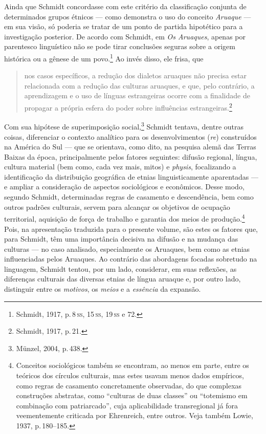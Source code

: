 Ainda que Schmidt concordasse com este critério da classificação
conjunta de determinados grupos étnicos --- como demonstra o uso do
conceito \textit{Aruaque} --- em sua visão, só poderia se tratar de um ponto
de partida hipotético para a investigação posterior. De acordo com
Schmidt, em \textit{Os Aruaques}, apenas por parentesco linguístico não se
pode tirar conclusões seguras sobre a origem histórica ou a gênese de um
povo.\footnote{Schmidt, 1917, p.\,8\,\textsc{ss}, 15\,\textsc{ss}, 19\,\textsc{ss} e 72.} Ao invés disso, ele frisa, que


\begin{quote}
nos casos específicos, a redução dos dialetos aruaques não precisa estar
relacionada com a redução das culturas aruaques, e que, pelo contrário, a
aprendizagem e o uso de línguas estrangeiras ocorre com a finalidade de
propagar a própria esfera do poder sobre influências
estrangeiras.\footnote{Schmidt, 1917, p.\,21.} %
\end{quote}

Com sua hipótese de superimposição social,\footnote{Münzel, 2004, p.\,438.}
Schmidt tentava, dentre outras coisas, diferenciar o contexto analítico
para os desenvolvimentos (\textit{re}) construídos na América do Sul --- que se
orientava, como dito, na pesquisa alemã das Terras Baixas da época,
principalmente pelos fatores seguintes: difusão regional, língua,
cultura material (bem como, cada vez mais, mitos) e \textit{physis},
focalizando a identificação da distribuição geográfica de etnias
linguisticamente aparentadas --- e ampliar a consideração de aspectos
sociológicos e econômicos. Desse modo, segundo Schmidt, determinadas
regras de casamento e descendência, bem como outros padrões culturais,
servem para alcançar os objetivos de ocupação territorial, aquisição de
força de trabalho e garantia dos meios de produção.\footnote{Conceitos
  sociológicos também se encontram, ao menos em parte, entre os teóricos
  dos círculos culturais, mas estes usavam menos dados empíricos, como
  regras de casamento concretamente observadas, do que complexas
  construções abstratas, como ``culturas de duas classes'' ou
  ``totemismo em combinação com patriarcado'', cuja aplicabilidade
  transregional já fora veementemente criticada por Ehrenreich, entre
  outros. Veja também Lowie, 1937, p.\,180--185.} Pois, na apresentação
traduzida para o presente volume, são estes os fatores que, para
Schmidt, têm uma importância decisiva na difusão e na mudança das
culturas --- no caso analisado, especialmente os Aruaques, bem como as
etnias influenciadas pelos Aruaques. Ao contrário das abordagens focadas
sobretudo na linguagem, Schmidt tentou, por um lado, considerar, em
suas reflexões, as diferenças culturais das diversas etnias de língua
aruaque e, por outro lado, distinguir entre os \textit{motivos}, os \textit{meios}
e a \textit{essência} da expansão.

